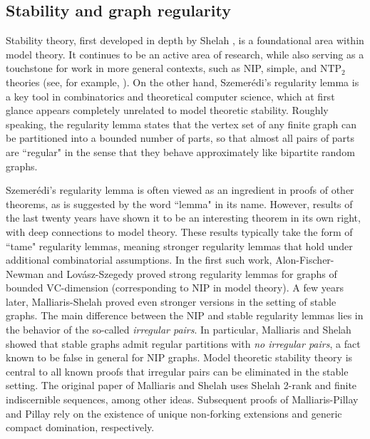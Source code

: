 \documentclass[12pt,oneside,british,a4wide]{amsart}
\numberwithin{equation}{section}
\theoremstyle{definition}
\def\VC{\mathrm{VC}}
\begin{document}
\subsection{Stability and graph regularity}\label{subsec:stabilitygraphs}

Stability theory, first developed in depth by Shelah \cite{Shelah.1990o5n}, is a foundational area within model theory. It continues to be an active area of research, while also serving as a touchstone for work in more general contexts, such as NIP, simple, and $\textrm{NTP}_2$ theories (see, for example, \cite{Simon.2015,Kim.1997,Chernikov.2014,Kaplan.2020}).  On the other hand, Szemer\'{e}di's regularity lemma \cite{Szemeredi.1975} is a key tool in combinatorics and theoretical computer science, which at first glance appears completely unrelated to model theoretic stability.  Roughly speaking, the regularity lemma states that the vertex set of any finite graph can be partitioned into a bounded number of parts, so that almost all pairs of parts are ``regular" in the sense that they behave approximately like bipartite random graphs.


Szemer\'{e}di's regularity lemma is often viewed as an ingredient in proofs of other theorems, as is suggested by the word ``lemma" in its name. However, results of the last twenty years have shown it to be an interesting theorem in its own right, with deep connections to model theory. These results typically take the form of ``tame" regularity lemmas, meaning stronger regularity lemmas that hold under additional combinatorial assumptions.  In the first such work, Alon-Fischer-Newman  \cite{Alon.2007} and Lov\'{a}sz-Szegedy \cite{Lovasz.2007}  proved strong  regularity lemmas for graphs of bounded $\VC$-dimension (corresponding to NIP in model theory).  A few years later, Malliaris-Shelah \cite{Malliaris.2014} proved even stronger versions in the setting of stable graphs.   The main difference between the  NIP and stable regularity lemmas lies in the behavior of the so-called \emph{irregular pairs}.  In particular,  Malliaris and Shelah showed that stable graphs admit regular partitions with \emph{no irregular pairs}, a fact known to be false in general for NIP graphs.     Model theoretic stability theory is central to all known proofs that irregular pairs can be eliminated in the stable setting. The original paper of Malliaris and Shelah uses Shelah 2-rank and finite indiscernible sequences, among other ideas. Subsequent proofs of Malliaris-Pillay \cite{Malliaris.2016} and Pillay \cite{Pillay.2020} rely on the existence of unique non-forking extensions and generic compact domination, respectively.   
\end{document}
